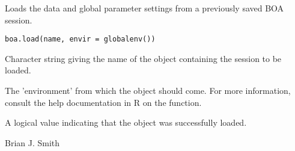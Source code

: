 \begin{Description}\relax
Loads the data and global parameter settings from a previously saved BOA
session.
\end{Description}
\begin{Usage}
\begin{verbatim}
boa.load(name, envir = globalenv())
\end{verbatim}
\end{Usage}
\begin{Arguments}
\begin{ldescription}
\item[\code{name}] Character string giving the name of the object containing the
session to be loaded.
\item[\code{envir}] The 'environment' from which the object should come. For more
information, consult the help documentation in R on the  function.
\end{ldescription}
\end{Arguments}
\begin{Value}
A logical value indicating that the object was successfully loaded.
\end{Value}
\begin{Author}\relax
Brian J. Smith
\end{Author}

